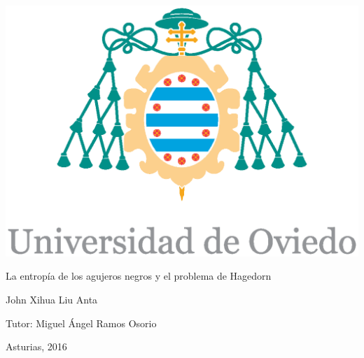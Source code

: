 
\thispagestyle{empty}

\begin{center}
\begin{minipage}{1\linewidth}
\centering 
\includegraphics[width=0.6\linewidth]{uniovi.eps}

{\Huge La entropía de los agujeros negros y el problema de Hagedorn }
\vspace{2cm}


{\LARGE  John Xihua Liu Anta}
\vspace{8cm}




{\Large Tutor: Miguel Ángel Ramos Osorio}
\vspace{1cm}


{\Large Asturias, 2016}
 
\end{minipage}
\end{center}
\clearpage

%
%
